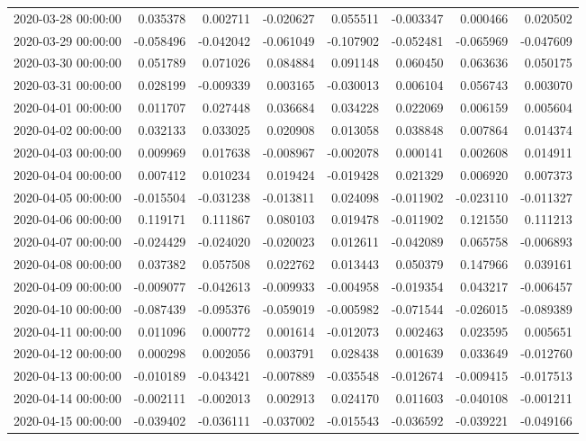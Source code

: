 \begin{tabular}{lrrrrrrr}
2020-03-28 00:00:00 & 0.035378 & 0.002711 & -0.020627 & 0.055511 & -0.003347 & 0.000466 & 0.020502 \\
2020-03-29 00:00:00 & -0.058496 & -0.042042 & -0.061049 & -0.107902 & -0.052481 & -0.065969 & -0.047609 \\
2020-03-30 00:00:00 & 0.051789 & 0.071026 & 0.084884 & 0.091148 & 0.060450 & 0.063636 & 0.050175 \\
2020-03-31 00:00:00 & 0.028199 & -0.009339 & 0.003165 & -0.030013 & 0.006104 & 0.056743 & 0.003070 \\
2020-04-01 00:00:00 & 0.011707 & 0.027448 & 0.036684 & 0.034228 & 0.022069 & 0.006159 & 0.005604 \\
2020-04-02 00:00:00 & 0.032133 & 0.033025 & 0.020908 & 0.013058 & 0.038848 & 0.007864 & 0.014374 \\
2020-04-03 00:00:00 & 0.009969 & 0.017638 & -0.008967 & -0.002078 & 0.000141 & 0.002608 & 0.014911 \\
2020-04-04 00:00:00 & 0.007412 & 0.010234 & 0.019424 & -0.019428 & 0.021329 & 0.006920 & 0.007373 \\
2020-04-05 00:00:00 & -0.015504 & -0.031238 & -0.013811 & 0.024098 & -0.011902 & -0.023110 & -0.011327 \\
2020-04-06 00:00:00 & 0.119171 & 0.111867 & 0.080103 & 0.019478 & -0.011902 & 0.121550 & 0.111213 \\
2020-04-07 00:00:00 & -0.024429 & -0.024020 & -0.020023 & 0.012611 & -0.042089 & 0.065758 & -0.006893 \\
2020-04-08 00:00:00 & 0.037382 & 0.057508 & 0.022762 & 0.013443 & 0.050379 & 0.147966 & 0.039161 \\
2020-04-09 00:00:00 & -0.009077 & -0.042613 & -0.009933 & -0.004958 & -0.019354 & 0.043217 & -0.006457 \\
2020-04-10 00:00:00 & -0.087439 & -0.095376 & -0.059019 & -0.005982 & -0.071544 & -0.026015 & -0.089389 \\
2020-04-11 00:00:00 & 0.011096 & 0.000772 & 0.001614 & -0.012073 & 0.002463 & 0.023595 & 0.005651 \\
2020-04-12 00:00:00 & 0.000298 & 0.002056 & 0.003791 & 0.028438 & 0.001639 & 0.033649 & -0.012760 \\
2020-04-13 00:00:00 & -0.010189 & -0.043421 & -0.007889 & -0.035548 & -0.012674 & -0.009415 & -0.017513 \\
2020-04-14 00:00:00 & -0.002111 & -0.002013 & 0.002913 & 0.024170 & 0.011603 & -0.040108 & -0.001211 \\
2020-04-15 00:00:00 & -0.039402 & -0.036111 & -0.037002 & -0.015543 & -0.036592 & -0.039221 & -0.049166 \\

\end{tabular}
